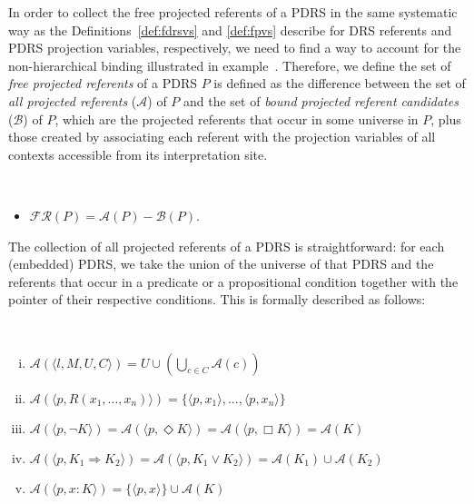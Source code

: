 In order to collect the free projected referents of a PDRS in the same
systematic way as the Definitions~\ref{def:fdrsvs} and \ref{def:fpvs}
describe for DRS referents and PDRS projection variables, respectively, we
need to find a way to account for the non-hierarchical binding illustrated
in example~\Last.  Therefore, we define the set of \textit{free projected
referents} of a PDRS $P$ is defined as the difference between the set of
\textit{all projected referents} ($\mathcal{A}$) of $P$ and the set of
\textit{bound projected referent candidates} ($\mathcal{B}$) of $P$, which
are the projected referents that occur in some universe in $P$, plus those
created by associating each referent with the projection variables of all
contexts accessible from its interpretation site.

\begin{definition}~
  \begin{itemize}
    \item $\mathcal{FR}(P) = \mathcal{A}(P) - \mathcal{B}(P)$.
  \end{itemize}
\end{definition}

\noindent The collection of all projected referents of a PDRS is
straightforward: for each (embedded) PDRS, we take the union of the universe
of that PDRS and the referents that occur in a predicate or a propositional
condition together with the pointer of their respective conditions. This is
formally described as follows:

\begin{subdefinition}~
  \begin{enumerate}[i.]
    \item $\mathcal{A}(\langle l, M, U, C \rangle)
      = U \cup (\bigcup_{c\in C} \mathcal{A}(c))$
    \item $\mathcal{A}(\langle p, R(x_1,...,x_n)\rangle)
      = \{\langle p, x_1\rangle, ..., \langle p, x_n\rangle\}$
    \item $\mathcal{A}(\langle p,\neg K\rangle) 
      = \mathcal{A}(\langle p,\Diamond K\rangle) 
      = \mathcal{A}(\langle p,\Box K\rangle)
      = \mathcal{A}(K)$
    \item $\mathcal{A}(\langle p,K_1 \Rightarrow K_2\rangle)
      = \mathcal{A}(\langle p,K_1 \vee K_2\rangle)
      = \mathcal{A}(K_1) \cup \mathcal{A}(K_2)$
    \item $\mathcal{A}(\langle p,x:K\rangle)
      = \{\langle p,x \rangle\} \cup \mathcal{A}(K)$
  \end{enumerate}
\end{subdefinition}

